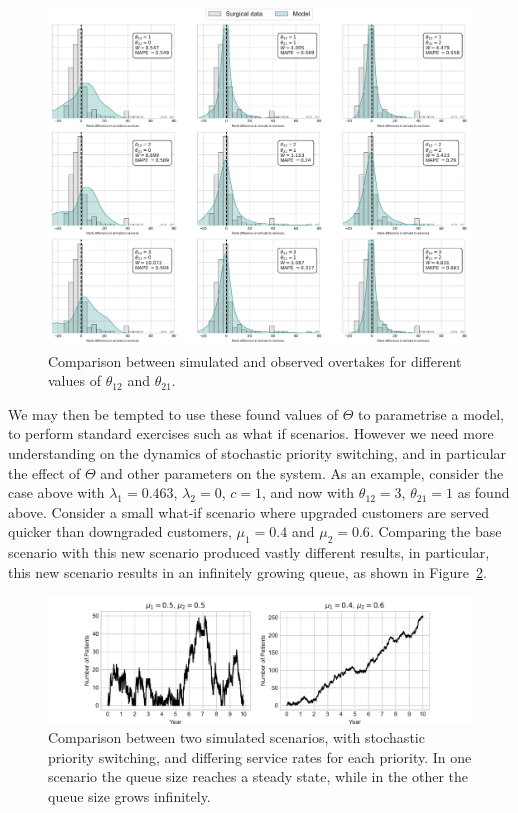 \documentclass{article}
\begin{document}
\begin{figure}
  \begin{center}
    \includegraphics[width=\textwidth]{img/fitting_theta.pdf}
  \end{center}
  \caption{Comparison between simulated and observed overtakes for different
  values of $\theta_{12}$ and $\theta_{21}$.}
  \label{fig:fitting_theta}
\end{figure}

We may then be tempted to use these found values of $\Theta$ to parametrise a
model, to perform standard exercises such as what if scenarios. However we need
more understanding on the dynamics of stochastic priority switching, and in
particular the effect of $\Theta$ and other parameters on the system. As an 
example, consider the case above with $\lambda_1 = 0.463$, $\lambda_2 = 0$,
$c = 1$, and now with $\theta_{12}=3$, $\theta_{21}=1$ as found above. Consider
a small what-if scenario where upgraded customers are served quicker than
downgraded customers, $\mu_1 = 0.4$ and $\mu_2 = 0.6$. Comparing the base
scenario with this new scenario produced vastly different results, in
particular, this new scenario results in an infinitely growing queue, as shown
in Figure~\ref{fig:toy_scenario}.

\begin{figure}
  \begin{center}
    \includegraphics[width=\textwidth]{img/adjust_service_rate.pdf}
  \end{center}
  \caption{Comparison between two simulated scenarios, with stochastic priority
  switching, and differing service rates for each priority. In one scenario the
  queue size reaches a steady state, while in the other the queue size grows
  infinitely.}
  \label{fig:toy_scenario}
\end{figure}
\end{document}
